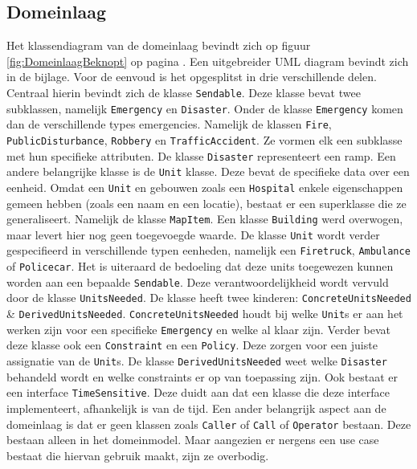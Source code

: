 \subsection{Domeinlaag}
 Het klassendiagram van de domeinlaag bevindt zich op figuur \ref{fig:DomeinlaagBeknopt} op pagina \pageref{fig:DomeinlaagBeknopt}. Een uitgebreider UML diagram bevindt zich in de bijlage. Voor de eenvoud is het opgesplitst in drie verschillende delen. Centraal hierin bevindt zich de klasse \texttt{Sendable}. Deze klasse bevat twee subklassen, namelijk \texttt{Emergency} en \texttt{Disaster}. Onder de klasse \texttt{Emergency} komen dan de verschillende types emergencies. Namelijk de klassen \texttt{Fire}, \texttt{PublicDisturbance}, \texttt{Robbery} en \texttt{TrafficAccident}. Ze vormen elk een subklasse met hun specifieke attributen. De klasse \texttt{Disaster} representeert een ramp. Een andere belangrijke klasse is de \texttt{Unit} klasse. Deze bevat de specifieke data over een eenheid. Omdat een \texttt{Unit} en gebouwen zoals een \texttt{Hospital} enkele eigenschappen gemeen hebben (zoals een naam en een locatie), bestaat er een superklasse die ze generaliseert. Namelijk de klasse \texttt{MapItem}. Een klasse \texttt{Building} werd overwogen, maar levert hier nog geen toegevoegde waarde. De klasse \texttt{Unit} wordt verder gespecifieerd in verschillende typen eenheden, namelijk een \texttt{Firetruck}, \texttt{Ambulance} of \texttt{Policecar}. Het is uiteraard de bedoeling dat deze units toegewezen kunnen worden aan een bepaalde \texttt{Sendable}. Deze verantwoordelijkheid wordt vervuld door de klasse \texttt{UnitsNeeded}. De klasse heeft twee kinderen: \texttt{ConcreteUnitsNeeded} \& \texttt{DerivedUnitsNeeded}. \texttt{ConcreteUnitsNeeded} houdt bij welke \texttt{Unit}s  er aan het werken zijn voor een specifieke \texttt{Emergency} en welke al klaar zijn. Verder bevat deze klasse ook een \texttt{Constraint} en een \texttt{Policy}. Deze zorgen voor een juiste assignatie van de \texttt{Unit}s. De klasse \texttt{DerivedUnitsNeeded} weet welke \texttt{Disaster} behandeld wordt en welke constraints er op van toepassing zijn. Ook bestaat er een interface \texttt{TimeSensitive}. Deze duidt aan dat een klasse die deze interface implementeert, afhankelijk is van de tijd. Een ander belangrijk aspect aan de domeinlaag is dat er geen klassen zoals \texttt{Caller} of \texttt{Call} of \texttt{Operator} bestaan. Deze bestaan alleen in het domeinmodel. Maar aangezien er nergens een use case bestaat die hiervan gebruik maakt, zijn ze overbodig.
 
